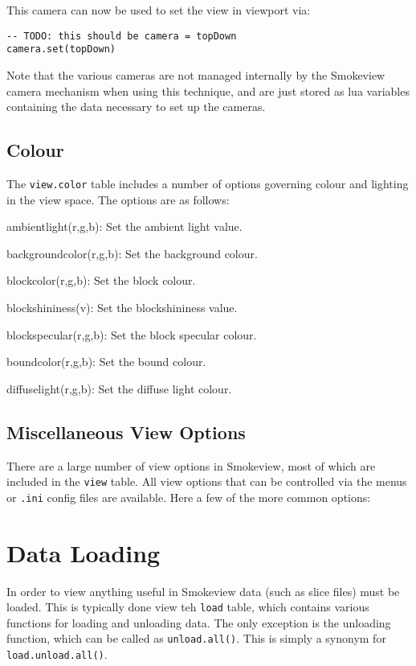\documentclass[11pt,twoside]{book}
\begin{document}
This camera can now be used to set the view in viewport via:

\begin{lstlisting}[style=lua]
-- TODO: this should be camera = topDown
camera.set(topDown)
\end{lstlisting}

Note that the various cameras are not managed internally by the Smokeview camera
mechanism when using this technique, and are just stored as lua variables
containing the data necessary to set up the cameras.

\subsection{Colour}

The \lstinline{view.color} table includes a number of options governing colour
and lighting in the view space. The options are as follows:

ambientlight(r,g,b): Set the ambient light value.

backgroundcolor(r,g,b): Set the background colour.

blockcolor(r,g,b): Set the block colour.

blockshininess(v): Set the blockshininess value.

blockspecular(r,g,b): Set the block specular colour.

boundcolor(r,g,b): Set the bound colour.

diffuselight(r,g,b): Set the diffuse light colour.

\subsection{Miscellaneous View Options}

There are a large number of view options in Smokeview, most of which are
included in the \lstinline{view} table. All view options that can be controlled
via the menus or \verb|.ini| config files are available. Here a few of the more
common options:

\section{Data Loading}

In order to view anything useful in Smokeview data (such as slice files) must be
loaded. This is typically done view teh \lstinline{load} table, which contains
various functions for loading and unloading data. The only exception is the
unloading function, which can be called as \lstinline{unload.all()}. This is
simply a synonym for \lstinline{load.unload.all()}.
\end{document}
